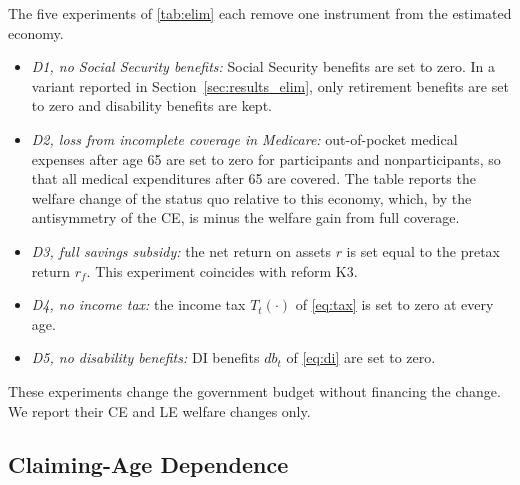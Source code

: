 The five experiments of \autoref{tab:elim} each remove one instrument from the estimated economy.
\begin{itemize}
\item \textit{D1, no Social Security benefits:} Social Security benefits are set to zero. In a variant reported in Section~\ref{sec:results_elim}, only retirement benefits are set to zero and disability benefits are kept.
\item \textit{D2, loss from incomplete coverage in Medicare:} out-of-pocket medical expenses after age 65 are set to zero for participants and nonparticipants, so that all medical expenditures after 65 are covered. The table reports the welfare change of the status quo relative to this economy, which, by the antisymmetry of the CE, is minus the welfare gain from full coverage.
\item \textit{D3, full savings subsidy:} the net return on assets $r$ is set equal to the pretax return $r_f$. This experiment coincides with reform K3.
\item \textit{D4, no income tax:} the income tax $T_t(\cdot)$ of \eqref{eq:tax} is set to zero at every age.
\item \textit{D5, no disability benefits:} DI benefits $db_t$ of \eqref{eq:di} are set to zero.
\end{itemize}
These experiments change the government budget without financing the change. We report their CE and LE welfare changes only.

\subsection{Claiming-Age Dependence}

